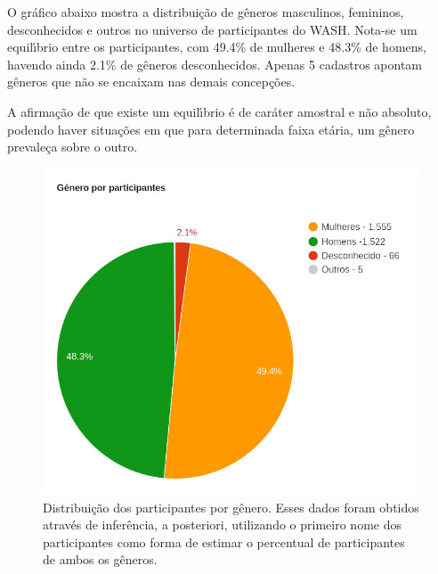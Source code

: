 \documentclass[
12pt,		%
openright,	%
twoside,  %
a4paper,			%
chapter=TITLE,		%
english,			%
french,				%
spanish,			%
brazil				%
]{USPSC-classe/USPSC_RedarTex}
\begin{document}
O gr\'afico abaixo mostra a distribui\c{c}\~ao de g\^eneros masculinos, femininos, desconhecidos e outros no universo de participantes do WASH. Nota-se um equil\'{\i}brio entre os participantes, com 49.4\% de mulheres e 48.3\% de homens, havendo ainda 2.1\% de g\^eneros desconhecidos. Apenas 5 cadastros apontam g\^eneros que n\~ao se encaixam nas demais concep\c{c}\~oes.










A afirma\c{c}\~ao de que existe um equil\'{\i}brio \'e de car\'ater amostral e n\~ao absoluto, podendo haver situa\c{c}\~oes em que para determinada faixa et\'aria, um g\^enero prevale\c{c}a sobre o outro.












\captionsetup{format=plain}
\begin{figure}[max size={\textwidth}{\textheight}]

\centering


\begin{minipage}[b]{0.4\linewidth}
        \centering
                \includegraphics[width=1.0\linewidth]{../../imagens/genero-todos-crop.jpeg}
                \caption{Distribui\c{c}\~ao dos participantes por g\^enero. Esses dados foram obtidos atrav\'es de infer\^encia, a posteriori, utilizando o primeiro nome dos participantes como forma de estimar o percentual de participantes de ambos os g\^eneros.}
                \label{ef11d820efb73d78fb64eb6bdd03853471a8e89f}
\end{minipage}%
\hspace{0.5cm}
\end{figure}
\end{document}
